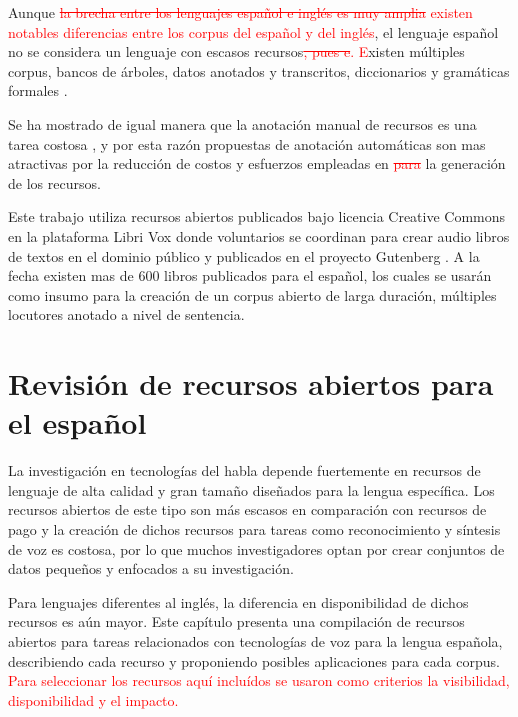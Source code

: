 \documentclass[a4paper,12pt,twoside]{report}
\newcommand{\macb}{\textcolor{red}}
\begin{document}


Aunque \macb{\st{la brecha entre los lenguajes espa\~nol e ingl\'es es muy amplia} existen notables diferencias entre los corpus del espa\~nol y del ingl\'es}, el lenguaje español no se considera un lenguaje con escasos recursos\macb{\st{, pues e}. E}xisten múltiples corpus, bancos de árboles, datos anotados y transcritos, diccionarios y gramáticas formales \cite{CavarGlobalGORILLA}. 

Se ha mostrado de igual manera que la anotación manual de recursos es una tarea costosa \cite{googleTTSLatinAmericanSpanishCorpus}, y por esta razón propuestas de anotación automáticas son mas atractivas por la reducción de costos y esfuerzos empleadas en \macb{\st{para}} la generación de los recursos.

Este trabajo utiliza recursos abiertos publicados bajo licencia Creative Commons en la plataforma Libri Vox \cite{LibriVox} donde voluntarios se coordinan para crear audio libros de textos en el dominio público y publicados en el proyecto Gutenberg \cite{gutenberg}. A la fecha existen mas de 600 libros publicados para el español, los cuales se usarán como insumo para la creación de un corpus abierto de larga duración, múltiples locutores anotado a nivel de sentencia.

\chapter{Revisión de recursos abiertos para el español}

La investigación en tecnologías del habla depende fuertemente en recursos de lenguaje de alta calidad y gran tamaño diseñados para la lengua específica. Los recursos abiertos de este tipo son más escasos en comparación con recursos de pago y la creación de dichos recursos para tareas como reconocimiento y síntesis de voz es costosa, por lo que muchos investigadores optan por crear conjuntos de datos pequeños y enfocados a su investigación.

Para lenguajes diferentes al inglés, la diferencia en disponibilidad de dichos recursos es aún mayor. Este capítulo presenta una compilación de recursos abiertos para tareas relacionados con tecnologías de voz para la lengua española, describiendo cada recurso y proponiendo posibles aplicaciones para cada corpus. \macb{Para seleccionar los recursos aqu\'i inclu\'idos se usaron como criterios la visibilidad, disponibilidad y el impacto.}

\end{document}
